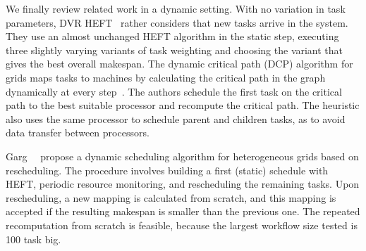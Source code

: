 \documentclass[conference]{IEEEtran}
\newcommand{\new}[1]{{\color{blue}#1}}
\begin{document}
\smallskip
{}
We finally review related work in a dynamic setting. With no variation in task parameters, 
    DVR HEFT~\cite{SANDOKJI2019482} rather considers that new tasks arrive in the system. 
    They use an almost unchanged HEFT algorithm in the static step, executing three slightly
    varying variants of task weighting and choosing the variant that gives the best overall makespan.
%
    The dynamic critical path (DCP) algorithm for grids maps tasks to machines
    by calculating the critical path in the graph dynamically at every step~\cite{rahman2013}.
    The authors schedule the first task on the critical path to the best suitable processor and recompute the critical path.
    The heuristic also uses the same processor to schedule parent and children tasks, as to avoid data transfer between processors.


    Garg~\etal~\cite{GARG2015256} propose a dynamic scheduling algorithm for heterogeneous grids based on rescheduling.
    The procedure involves building a first (static) schedule with HEFT, periodic resource monitoring, 
    and rescheduling the remaining tasks. 
    Upon rescheduling, a new mapping is calculated from scratch, and this mapping is accepted if the resulting makespan
    is smaller than the previous one.
    \new{The repeated recomputation from scratch is feasible, because the largest workflow size tested is 100 task big.}
%
\end{document}
